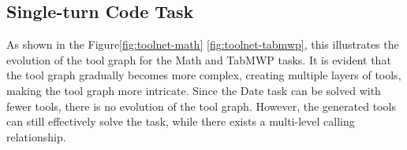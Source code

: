 \subsection{Single-turn Code Task}
\label{subsec:code-results}

As shown in the Figure\ref{fig:toolnet-math} \ref{fig:toolnet-tabmwp}, this illustrates the evolution of the tool graph for the Math and TabMWP tasks. It is evident that the tool graph gradually becomes more complex, creating multiple layers of tools, making the tool graph more intricate. Since the Date task can be solved with fewer tools, there is no evolution of the tool graph. However, the generated tools can still effectively solve the task, while there exists a multi-level calling relationship.

